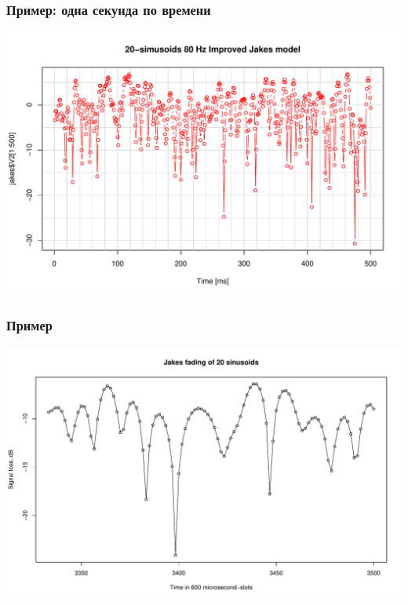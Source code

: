 \documentclass[utf8]{beamer}
\begin{document}
\begin{frame}
\frametitle{Пример: одна секунда по времени}
\centering
\includegraphics[width=1.1\textwidth]{pics/jakes-main.pdf}
\end{frame}
\begin{frame}
\frametitle{Пример}
\centering
\includegraphics[width=1.1\textwidth]{pics/jakes-zoom.pdf}
\end{frame}
\end{document}
